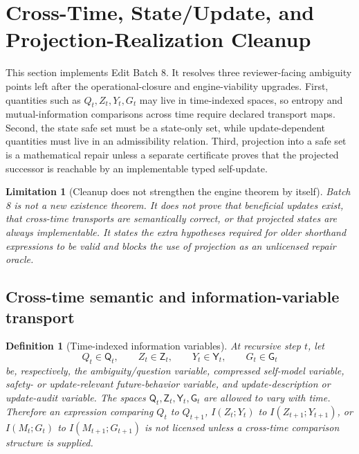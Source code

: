 \documentclass[11pt]{article}
\newtheorem{definition}[theorem]{Definition}
\newtheorem{limitation}[theorem]{Limitation}
\newcommand{\1}{\mathbf{1}}
\begin{document}
\section{Cross-Time, State/Update, and Projection-Realization Cleanup}
\label{sec:batch8_cross_time_state_update_projection}

This section implements Edit Batch 8. It resolves three reviewer-facing ambiguity points left after the operational-closure and engine-viability upgrades. First, quantities such as \(Q_t,Z_t,Y_t,G_t\) may live in time-indexed spaces, so entropy and mutual-information comparisons across time require declared transport maps. Second, the state safe set must be a state-only set, while update-dependent quantities must live in an admissibility relation. Third, projection into a safe set is a mathematical repair unless a separate certificate proves that the projected successor is reachable by an implementable typed self-update.

\begin{limitation}[Cleanup does not strengthen the engine theorem by itself]
Batch 8 is not a new existence theorem. It does not prove that beneficial updates exist, that cross-time transports are semantically correct, or that projected states are always implementable. It states the extra hypotheses required for older shorthand expressions to be valid and blocks the use of projection as an unlicensed repair oracle.
\end{limitation}

\subsection{Cross-time semantic and information-variable transport}

\begin{definition}[Time-indexed information variables]
At recursive step \(t\), let
\[
Q_t\in\mathsf Q_t,
\qquad
Z_t\in\mathsf Z_t,
\qquad
Y_t\in\mathsf Y_t,
\qquad
G_t\in\mathsf G_t
\]
be, respectively, the ambiguity/question variable, compressed self-model variable, safety- or update-relevant future-behavior variable, and update-description or update-audit variable. The spaces \(\mathsf Q_t,\mathsf Z_t,\mathsf Y_t,\mathsf G_t\) are allowed to vary with time. Therefore an expression comparing \(Q_t\) to \(Q_{t+1}\), \(I(Z_t;Y_t)\) to \(I(Z_{t+1};Y_{t+1})\), or \(I(M_t;G_t)\) to \(I(M_{t+1};G_{t+1})\) is not licensed unless a cross-time comparison structure is supplied.
\end{definition}
\end{document}
